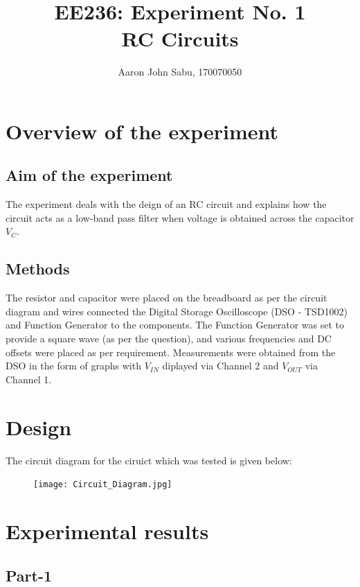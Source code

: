 \documentclass[12pt]{article}
\title{EE236: Experiment No. 1\\
RC Circuits}
\author{Aaron John Sabu, 170070050}
\begin{document}
\maketitle

\section{Overview of the experiment} 
\subsection{Aim of the experiment}

The experiment deals with the deign of an RC circuit and explains how the circuit acts as a low-band pass filter when voltage is obtained across the capacitor \(V_{C}\).

\subsection{Methods}

The resistor and capacitor were placed on the breadboard as per the circuit diagram and wires connected the Digital Storage Oscilloscope (DSO - TSD1002) and Function Generator to the components. The Function Generator was set to provide a square wave (as per the question), and various frequencies and DC offsets were placed as per requirement. Measurements were obtained from the DSO in the form of graphs with \(V_{IN}\) diplayed via Channel 2 and \(V_{OUT}\) via Channel 1.

\section{Design}

The circuit diagram for the ciruict which was tested is given below:
\begin{figure}[h!]

\centering
\texttt{[image: Circuit\_Diagram.jpg]}
\end{figure}

\section{Experimental results}
\subsection{Part-1}
\end{document}
